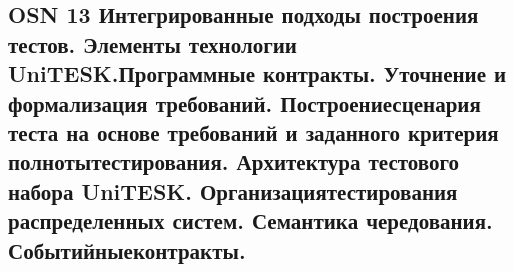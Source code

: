 \subsection{OSN 13 Интегрированные подходы построения тестов. Элементы технологии
UniTESK.Программные контракты. Уточнение и формализация требований.
Построениесценария теста на основе требований и заданного критерия
полнотытестирования. Архитектура тестового набора UniTESK.
Организациятестирования распределенных систем. Семантика чередования.
Событийныеконтракты.}

